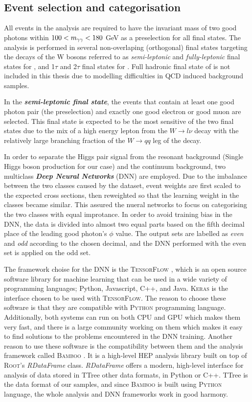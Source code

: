 {\subsection{Event selection and categorisation}

All events in the analysis are required to have the invariant mass of two good photons within $100<m_{\gamma\gamma}<180$ GeV as a preselection for all final states. The analysis is performed in several non-overlaping (orthogonal) final states targeting the decays of the W bosons referred to as \emph{semi-leptonic} and \emph{fully-leptonic} final states for \wwgg, and 1$\tau$ and 2$\tau$ final states for \ttgg. Full hadronic final state of \wwgg is not included in this thesis due to modelling difficulties in QCD induced background samples.

In the \emph{\bf{semi-leptonic final state}}, the events that contain at least one good photon pair (the preselection) and exactly one good electron or good muon are selected. This final state is expected to be the most sensitive of the two \wwgg final states due to the mix of a high energy lepton from the $W\rightarrow l\nu$ decay with the relatively large branching fraction of the $W\rightarrow qq$ leg of the decay.

In order to separate the Higgs pair signal from the resonant background (Single Higgs boson production for our case) and the continuum background, two multiclass \emph{\bf{Deep Neural Networks}} (DNN) are employed. Due to the imbalance between the two classes caused by the dataset, event weights are first scaled to the expected cross sections, then reweighted so that the learning weight in the classes became similar. This assured the nueral networks to focus on categorising the two classes with equal improtance. In order to avoid training bias in the DNN, the data is divided into almost two equal parts based on the fifth decimal place of the leading good photon's $\phi$ value. The output sets are labelled as \emph{even} and \emph{odd} according to the chosen decimal, and the DNN performed with the even set is applied on the odd set.

The framework choise for the DNN is the \textsc{TensorFlow} \cite{tensorflow}, which is an open source software library for machine learning that can be used in a wide variety of programming languages; Python, Javascript, C++, and Java. \textsc{Keras} \cite{keras} is the interface chosen to be used with \textsc{TensorFlow}. The reason to choose these software is that they are compatible with \textsc{Python} programming language. Additionally, both systems can run on both CPU and GPU which makes them very fast, and there is a large community working on them which makes it easy to find solutions to the problems encountered in the DNN training. Another reason to use these software is the compatibility between them and the analysis framework called \textsc{Bamboo} \cite{bamboo}. It is a high-level HEP analysis library built on top of \textsc{Root}'s \emph{RDataFrame} class. \emph{RDataFrame} offers a modern, high-level interface for analysis of data stored in TTree other data formats, in Python or C++. TTree is the data format of our samples, and since \textsc{Bamboo} is built using \textsc{Python} language, the whole analysis and DNN frameworks work in good harmony. 

}
